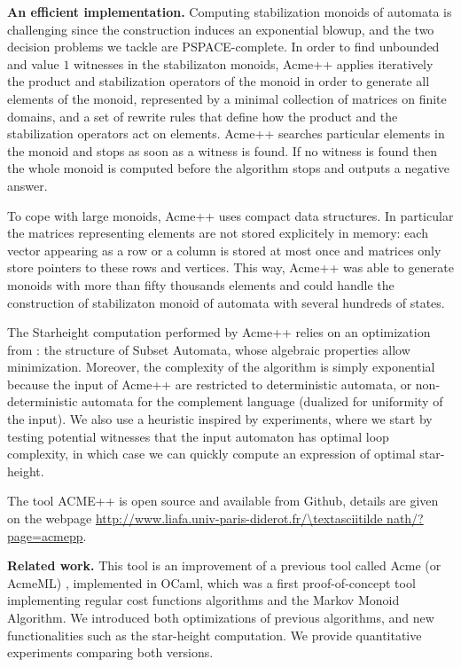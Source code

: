 \textbf{An efficient implementation.} Computing stabilization monoids of automata is challenging since the construction induces an exponential blowup, and the two decision problems we tackle are PSPACE-complete. In order to find unbounded and value $1$ witnesses in the stabilizaton monoids, Acme++
%
applies iteratively the product and stabilization operators of the monoid in order to generate all elements of the monoid, represented by a minimal collection of matrices on finite domains, and a set of rewrite rules that define how the product and the stabilization operators act on elements.
Acme++ searches particular elements in the monoid and stops as soon as a witness is found. If no witness is found then the whole monoid is computed before the algorithm stops and outputs a negative answer.

To cope with large monoids, Acme++ uses compact data structures. In particular the matrices representing elements are not stored explicitely in memory: each vector appearing as a row or a column is stored at most once and matrices only store pointers to these rows and vertices. This way, Acme++ was able to generate monoids with more than fifty thousands elements and could handle the construction of stabilizaton monoid of automata with several hundreds of states.

The Starheight computation performed by Acme++ relies on an optimization from \cite{CL08sh}: the structure of Subset Automata, whose algebraic properties allow minimization. Moreover, the complexity of the algorithm is simply exponential because the input of Acme++ are restricted to deterministic automata, or non-deterministic automata for the complement language (dualized for uniformity of the input). We also use a heuristic inspired by experiments, where we start by testing potential witnesses that the input automaton has optimal loop complexity, in which case we can quickly compute an expression of optimal star-height.

The tool ACME++ is open source and available from Github, details are given on the webpage
\url{http://www.liafa.univ-paris-diderot.fr/\textasciitilde nath/?page=acmepp}.

\textbf{Related work.}
This tool is an improvement of a previous tool called Acme (or AcmeML) \cite{FK14}, implemented in OCaml, which was a first proof-of-concept tool implementing regular cost functions algorithms and the Markov Monoid Algorithm.
We introduced both optimizations of previous algorithms, and new functionalities such as the  star-height computation. We provide quantitative experiments comparing both versions.




